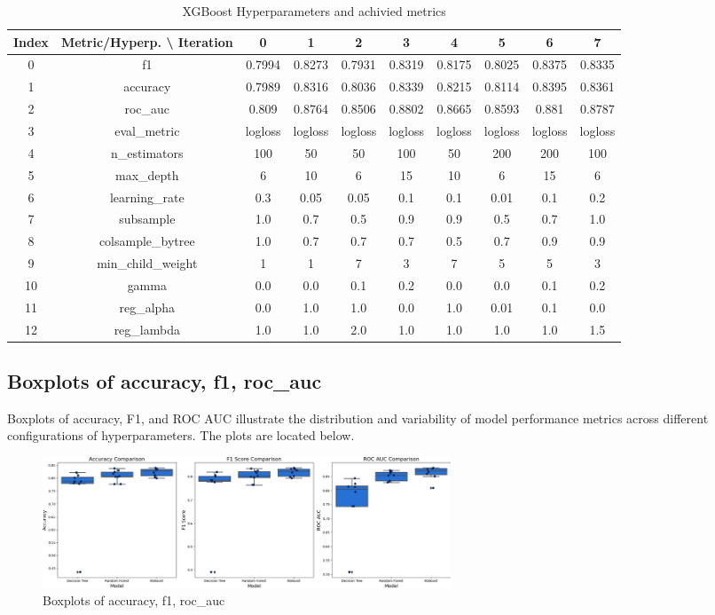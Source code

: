 \documentclass{article}%
\begin{document}
\begin{table}[h!]%
\caption{XGBoost Hyperparameters and achivied metrics}%
\vspace{0.2cm}%
\centering%
\begin{tabular}{|c||c||c||c||c||c||c||c||c||c|}%
\hline%
Index&Metric/Hyperp. \textbackslash{} Iteration&0&1&2&3&4&5&6&7\\%
\hline%
0&f1&0.7994&0.8273&0.7931&0.8319&0.8175&0.8025&0.8375&0.8335\\%
1&accuracy&0.7989&0.8316&0.8036&0.8339&0.8215&0.8114&0.8395&0.8361\\%
2&roc\_auc&0.809&0.8764&0.8506&0.8802&0.8665&0.8593&0.881&0.8787\\%
3&eval\_metric&logloss&logloss&logloss&logloss&logloss&logloss&logloss&logloss\\%
4&n\_estimators&100&50&50&100&50&200&200&100\\%
5&max\_depth&6&10&6&15&10&6&15&6\\%
6&learning\_rate&0.3&0.05&0.05&0.1&0.1&0.01&0.1&0.2\\%
7&subsample&1.0&0.7&0.5&0.9&0.9&0.5&0.7&1.0\\%
8&colsample\_bytree&1.0&0.7&0.7&0.7&0.5&0.7&0.9&0.9\\%
9&min\_child\_weight&1&1&7&3&7&5&5&3\\%
10&gamma&0.0&0.0&0.1&0.2&0.0&0.0&0.1&0.2\\%
11&reg\_alpha&0.0&1.0&1.0&0.0&1.0&0.01&0.1&0.0\\%
12&reg\_lambda&1.0&1.0&2.0&1.0&1.0&1.0&1.0&1.5\\%
\hline%
\end{tabular}%
\end{table}

%
\newpage%
\subsection{Boxplots of accuracy, f1, roc\_auc}%
\label{subsec:Boxplotsofaccuracy,f1,rocauc}%
Boxplots of accuracy, F1, and ROC AUC illustrate the distribution and variability of model performance metrics across different configurations of hyperparameters. The plots are located below.%


\begin{figure}[h!]%
\centering%
\includegraphics[width=460px]{ModelOptimization/box_plots_metrics.png}%
\caption{Boxplots of accuracy, f1, roc\_auc}%
\end{figure}
\end{document}
